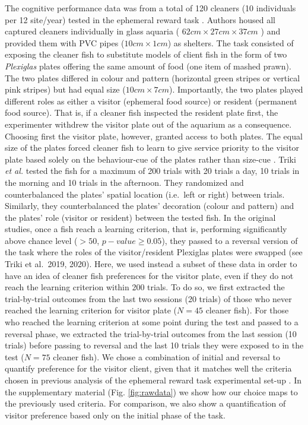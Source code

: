 \documentclass[]{rsos}%
\begin{document}
The cognitive performance data was from a total of 120 cleaners
(10 individuals per 12 site/year) tested in the
ephemeral reward task \citep{triki_Biological_2019, triki_Brain_2020}. Authors
housed all captured cleaners individually in glass aquaria
( \(62cm \times 27cm \times 37 cm\) ) and provided them
with PVC pipes (\(10 cm \times 1 cm\)) as shelters.
The task consisted of exposing the cleaner fish to substitute
models of client fish in the form of two \emph{Plexiglas} plates offering the
same amount of food (one item of mashed prawn). The two plates differed
in colour and pattern (horizontal green stripes or vertical pink stripes)
but had equal size (\(10 cm \times 7 cm\)). Importantly, the two plates played
different roles as either a visitor (ephemeral food source) or
resident (permanent food source). That is, if a cleaner fish inspected the
resident plate first, the experimenter withdrew the visitor plate out of
the aquarium as a consequence. Choosing first the visitor plate,
however, granted access to both plates. The equal size of the plates
forced cleaner fish to learn to give service priority to the visitor plate
based solely on the behaviour-cue of the plates rather than size-cue
\citep{wismer_Cuebased_2019}. Triki \emph{et al.} \citep{triki_Biological_2019, triki_Brain_2020}
tested the fish for a maximum of 200 trials with 20 trials a day, 10 trials
in the morning and 10 trials in the afternoon. They randomized and
counterbalanced the plates' spatial location (i.e.~left or right)
between trials. Similarly, they counterbalanced the plates' decoration
(colour and pattern) and the plates' role (visitor or resident) between the
tested fish. In the original studies, once a fish reach a learning criterion,
that is, performing significantly above chance level (\(> 50%
\), \(p-value ≥ 0.05\)),
they passed to a reversal version of the task where the roles of the
visitor/resident Plexiglas plates were swapped (see Triki et al.~2019, 2020).
Here, we used instead a subset of these data in order to have an idea of
cleaner fish preferences for the visitor plate, even if they do not reach
the learning criterion within 200 trials. To do so, we first extracted the
trial-by-trial outcomes from the last two sessions (20 trials) of those who
never reached the learning criterion for visitor plate
(\(N = 45\) cleaner fish).
For those who reached the learning criterion at some point during the
test and passed to a reversal phase, we extracted the trial-by-trial
outcomes from the last session (10 trials) before passing to reversal
and the last 10 trials they were exposed to in the test
(\(N = 75\) cleaner fish).
We chose a combination of initial and reversal to quantify preference
for the visitor client, given that it matches well the criteria chosen
in previous analysis of the ephemeral reward task experimental set-up
\citep{triki_Biological_2019, triki_Brain_2020}. In the
supplementary material (Fig. \ref{fig:rawdata}) we show how our choice maps
to the previously used criteria. For comparison, we also show a quantification
of visitor preference based only on the initial phase of the task.
\end{document}
